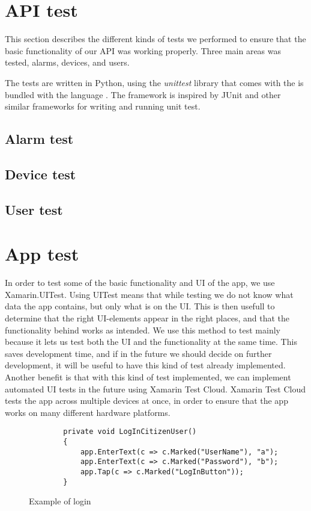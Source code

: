 \section{API test} 
This section describes the different kinds of tests we performed to ensure that the basic functionality of our API was working properly. Three main areas was tested, alarms, devices, and users. 

The tests are written in Python, using the \textit{unittest} library that comes with the is bundled with the language \cite{unittest}. The framework is inspired by JUnit and other similar frameworks for writing and running unit test.

\subsection{Alarm test}


\subsection{Device test}


\subsection{User test}



\section{App test}
In order to test some of the basic functionality and UI of the app, we use Xamarin.UITest. Using UITest means that while testing we do not know what data the app contains, but only what is on the UI. This is then usefull to determine that the right UI-elements appear in the right places, and that the functionality behind works as intended. We use this method to test mainly because it lets us test both the UI and the functionality at the same time. This saves development time, and if in the future we should decide on further development, it will be useful to have this kind of test already implemented.
Another benefit is that with this kind of test implemented, we can implement automated UI tests in the future using Xamarin Test Cloud. Xamarin Test Cloud tests the app across multiple devices at once, in order to ensure that the app works on many different hardware platforms. 

\begin{figure}[ht]
    \centering
    \begin{lstlisting}
        private void LogInCitizenUser()
        {
            app.EnterText(c => c.Marked("UserName"), "a");
            app.EnterText(c => c.Marked("Password"), "b");
            app.Tap(c => c.Marked("LogInButton"));
        }
        \end{lstlisting}
    \caption{Example of login}
    \label{fig:test:loginFunction}
\end{figure}

